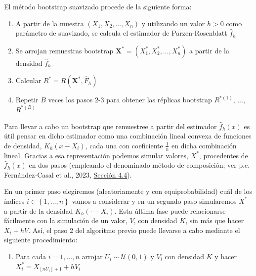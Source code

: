 \documentclass[
]{book}
\providecommand{\tightlist}{%
  \setlength{\itemsep}{0pt}\setlength{\parskip}{0pt}}
\renewcommand{\mathbf}[1]{\symbf{#1}}
\theoremstyle{break}
\theoremstyle{nonumberplain}
\begin{document}
El método bootstrap suavizado procede de la siguiente forma:

\begin{enumerate}
\def\labelenumi{\arabic{enumi}.}
\item
  A partir de la muestra \(\left( X_1,X_2,\ldots ,X_n \right)\) y
  utilizando un valor \(h>0\) como parámetro de suavizado, se calcula el
  estimador de Parzen-Rosenblatt \(\hat{f}_{h}\)
\item
  Se arrojan remuestras bootstrap \(\mathbf{X}^{\ast}=\left(
  X_1^{\ast},X_2^{\ast},\ldots ,X_n^{\ast} \right)\) a partir de
  la densidad \(\hat{f}_{h}\)
\item
  Calcular
  \(R^{\ast}=R\left( \mathbf{X}^{\ast},\hat{F}_{h} \right)\)
\item
  Repetir \(B\) veces los pasos 2-3 para obtener las réplicas bootstrap
  \(R^{\ast (1)}\), \(\ldots\), \(R^{\ast (B)}\)
\end{enumerate}

Para llevar a cabo un bootstrap que remuestree a partir del estimador
\(\hat{f}_{h}\left( x \right)\) es útil pensar en dicho estimador como una
combinación lineal convexa de funciones de densidad, \(K_{h}\left(
x-X_i \right)\), cada una con coeficiente \(\frac{1}{n}\) en dicha
combinación lineal. Gracias a esa representación podemos simular
valores,
\(X^{\ast}\), procedentes de \(\hat{f}_{h}\left( x \right)\) en dos pasos (empleando el denominado método de composición; ver p.e. Fernández-Casal et al., 2023, \href{https://rubenfcasal.github.io/simbook/composicion.html}{Sección 4.4}).

En un primer paso elegiremos (aleatoriamente y con equiprobabilidad)
cuál de los índices \(i\in \left\{ 1,\ldots ,n\right\}\) vamos a
considerar y en un segundo paso simularemos \(X^{\ast}\) a partir de la
densidad \(K_{h}\left(
\cdot -X_i \right)\). Esta última fase puede relacionarse fácilmente
con la simulación de un valor, \(V\), con densidad \(K\), sin más que hacer
\(X_i+hV\). Así, el paso 2 del algoritmo previo puede llevarse a cabo
mediante el siguiente procedimiento:

\begin{enumerate}
\def\labelenumi{\arabic{enumi}.}
\setcounter{enumi}{1}
\tightlist
\item
  Para cada \(i=1,\ldots ,n\) arrojar \(U_i\sim \mathcal{U}\left( 0,1 \right)\) y
  \(V_i\) con densidad \(K\) y hacer \(X_i^{\ast}=X_{\left\lfloor
  nU_i\right\rfloor +1}+hV_i\)
\end{enumerate}
\end{document}
